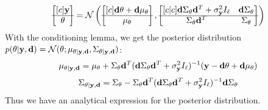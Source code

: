 \begin{equation}
  \begin{bmatrix}[c]
    \mathbf{y}\\
    \hline
    \theta 
  \end{bmatrix}
  =
  \mathcal{N}\left(
    \begin{bmatrix}[c]
      \mathbf{d}\theta + \mathbf{d}\mu_\theta\\
      \hline
      \mu_\theta
    \end{bmatrix},
    \begin{bmatrix}[c | c]
      \mathbf{d}\Sigma_{\mathbf{\theta}}\mathbf{d}^T + \sigma^2_{\mathbf{y}} I_\ell &     \mathbf{d}\Sigma_{\mathbf{\theta}} \\
      \hline
      \Sigma_{\mathbf{\theta}}\mathbf{d}^T & \Sigma_{\mathbf{\theta}}
    \end{bmatrix}
  \right)
\end{equation}
With the conditioning lemma, we get the posterior distribution $p(\theta | \mathbf{y}, \mathbf{d}) = \mathcal{N}(\theta; \mu_{\theta| \mathbf{y}, \mathbf{d}}, \Sigma_{\theta | \mathbf{y}, \mathbf{d}})$:
\begin{equation}
  \label{eq:posterior-mean}
  \mu_{\theta | \mathbf{y}, \mathbf{d}} = \mu_\theta + \Sigma_\theta \mathbf{d}^T (\mathbf{d} \Sigma_\theta \mathbf{d}^T + \sigma^2_{\mathbf{y}} I_\ell)^{-1}(\mathbf{y} - \mathbf{d}\theta + \mathbf{d}\mu_\theta)
\end{equation}
\begin{equation}
  \label{eq:posterior-cov}
  \Sigma_{\theta | \mathbf{y}, \mathbf{d}} = \Sigma_\theta - \Sigma_\theta \mathbf{d}^T (\mathbf{d} \Sigma_\theta \mathbf{d}^T + \sigma^2_{\mathbf{y}} I_\ell)^{-1}\mathbf{d}\Sigma_\theta
\end{equation}
Thus we have an analytical expression for the posterior distribution.
